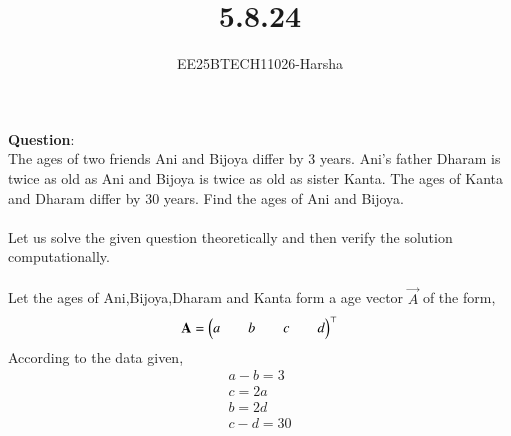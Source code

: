 \documentclass[journal]{IEEEtran}
\begin{document}

\vspace{3cm}

\title{5.8.24}
\author{EE25BTECH11026-Harsha}
 \maketitle
{\let\newpage\relax\maketitle}

\renewcommand{\thefigure}{\theenumi}
\renewcommand{\thetable}{\theenumi}
\setlength{\intextsep}{10pt} %


\renewcommand{\thetable}{\theenumi}

\textbf{Question}:\\
The ages of two friends Ani and Bijoya differ by 3 years. Ani's father Dharam is
twice as old as Ani and Bijoya is twice as old as sister Kanta. The ages of Kanta and Dharam differ by 30 years. Find the ages of Ani and Bijoya.\\
\solution \\
Let us solve the given question theoretically and then verify the solution computationally.\\
\\
Let the ages of Ani,Bijoya,Dharam and Kanta form a age vector $\vec{A}$ of the form,
\begin{align}
    \mathbf{A}=\begin{pmatrix}a&&b&&c&&d\end{pmatrix}^{\top}
\end{align}
According to the data given,
\begin{align}
    a-b=3\\
    c=2a\\
    b=2d\\
    c-d=30
\end{align}
\end{document}
